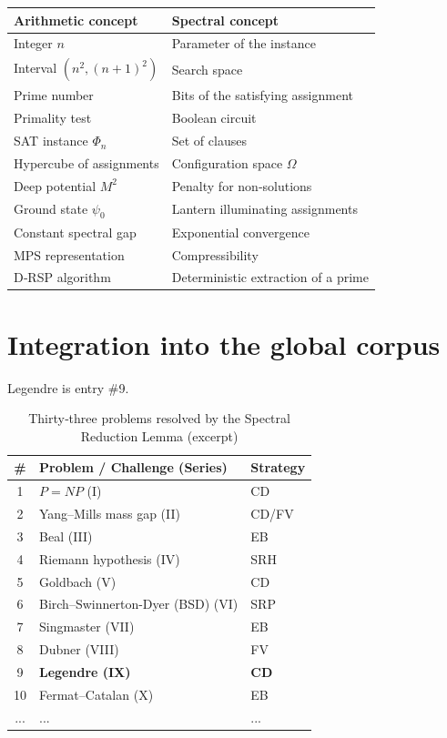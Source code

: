 \documentclass[11pt,a4paper]{article}
\begin{document}
\begin{center}
\small
\begin{tabular}{@{}l|l@{}}
\toprule
\textbf{Arithmetic concept} & \textbf{Spectral concept} \\
\midrule
Integer $n$ & Parameter of the instance \\
Interval $(n^2, (n+1)^2)$ & Search space \\
Prime number & Bits of the satisfying assignment \\
Primality test & Boolean circuit \\
SAT instance $\Phi_n$ & Set of clauses \\
Hypercube of assignments & Configuration space $\Omega$ \\
Deep potential $M^2$ & Penalty for non‑solutions \\
Ground state $\psi_0$ & Lantern illuminating assignments \\
Constant spectral gap & Exponential convergence \\
MPS representation & Compressibility \\
D‑RSP algorithm & Deterministic extraction of a prime \\
\bottomrule
\end{tabular}
\end{center}

\section{Integration into the global corpus}

Legendre is entry \#9.

\begin{center}
\small
\begin{longtable}{@{}cll@{}}
\caption{Thirty‑three problems resolved by the Spectral Reduction Lemma (excerpt)}\\
\toprule
\# & Problem / Challenge (Series) & Strategy \\
\midrule
1 & \(P = NP\) (I) & CD \\
2 & Yang–Mills mass gap (II) & CD/FV \\
3 & Beal (III) & EB \\
4 & Riemann hypothesis (IV) & SRH \\
5 & Goldbach (V) & CD \\
6 & Birch–Swinnerton-Dyer (BSD) (VI) & SRP \\
7 & Singmaster (VII) & EB \\
8 & Dubner (VIII) & FV \\
9 & \textbf{Legendre (IX)} & \textbf{CD} \\
10 & Fermat–Catalan (X) & EB \\
... & ... & ... \\
\bottomrule
\end{longtable}
\end{center}
\end{document}
